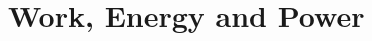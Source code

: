 \documentclass[../mech.tex]{subfiles}
\begin{document}
\chapter{Work, Energy and Power}
\end{document}
